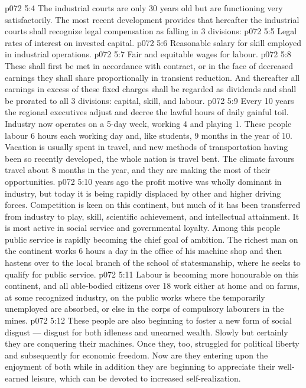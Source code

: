 \vs p072 5:4 The industrial courts are only 30 years old but are functioning very satisfactorily. The most recent development provides that hereafter the industrial courts shall recognize legal compensation as falling in 3 divisions:
\vs p072 5:5 \bibnobreakspace Legal rates of interest on invested capital.
\vs p072 5:6 \bibnobreakspace Reasonable salary for skill employed in industrial operations.
\vs p072 5:7 \bibnobreakspace Fair and equitable wages for labour.
\vs p072 5:8 \pc These shall first be met in accordance with contract, or in the face of decreased earnings they shall share proportionally in transient reduction. And thereafter all earnings in excess of these fixed charges shall be regarded as dividends and shall be prorated to all 3 divisions: capital, skill, and labour.
\vs p072 5:9 \pc Every 10 years the regional executives adjust and decree the lawful hours of daily gainful toil. Industry now operates on a 5\hyp{}day week, working 4 and playing 1. These people labour 6 hours each working day and, like students, 9 months in the year of 10. Vacation is usually spent in travel, and new methods of transportation having been so recently developed, the whole nation is travel bent. The climate favours travel about 8 months in the year, and they are making the most of their opportunities.
\vs p072 5:10  years ago the profit motive was wholly dominant in industry, but today it is being rapidly displaced by other and higher driving forces. Competition is keen on this continent, but much of it has been transferred from industry to play, skill, scientific achievement, and intellectual attainment. It is most active in social service and governmental loyalty. Among this people public service is rapidly becoming the chief goal of ambition. The richest man on the continent works 6 hours a day in the office of his machine shop and then hastens over to the local branch of the school of statesmanship, where he seeks to qualify for public service.
\vs p072 5:11 Labour is becoming more honourable on this continent, and all able\hyp{}bodied citizens over 18 work either at home and on farms, at some recognized industry, on the public works where the temporarily unemployed are absorbed, or else in the corps of compulsory labourers in the mines.
\vs p072 5:12 These people are also beginning to foster a new form of social disgust --- disgust for both idleness and unearned wealth. Slowly but certainly they are conquering their machines. Once they, too, struggled for political liberty and subsequently for economic freedom. Now are they entering upon the enjoyment of both while in addition they are beginning to appreciate their well\hyp{}earned leisure, which can be devoted to increased self\hyp{}realization.
